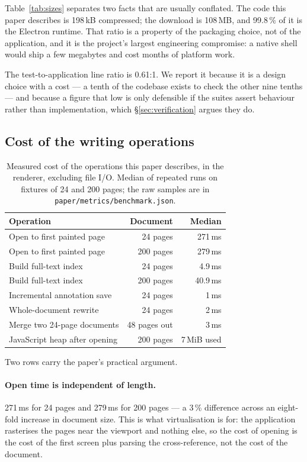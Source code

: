 Table~\ref{tab:sizes} separates two facts that are usually conflated. The code this paper
describes is 198\,kB compressed; the download is 108\,MB, and 99.8\,\% of it is the Electron
runtime. That ratio is a property of the packaging choice, not of the application, and it is
the project's largest engineering compromise: a native shell would ship a few megabytes and
cost months of platform work.

The test-to-application line ratio is 0.61:1. We report it because it is a design choice with
a cost --- a tenth of the codebase exists to check the other nine tenths --- and because a
figure that low is only defensible if the suites assert behaviour rather than implementation,
which \S\ref{sec:verification} argues they do.

\subsection{Cost of the writing operations}

\begin{table}[t]
  \centering
  \caption{Measured cost of the operations this paper describes, in the renderer, excluding
  file I/O. Median of repeated runs on fixtures of 24 and 200 pages; the raw samples are in
  \texttt{paper/\allowbreak metrics/\allowbreak benchmark.json}.}
  \label{tab:timings}
  \small
  \begin{tabular}{@{}lrr@{}}
    \toprule
    Operation & Document & Median \\
    \midrule
    Open to first painted page & 24 pages & 271\,ms \\
    Open to first painted page & 200 pages & 279\,ms \\
    Build full-text index & 24 pages & 4.9\,ms \\
    Build full-text index & 200 pages & 40.9\,ms \\
    Incremental annotation save & 24 pages & 1\,ms \\
    Whole-document rewrite & 24 pages & 2\,ms \\
    Merge two 24-page documents & 48 pages out & 3\,ms \\
    JavaScript heap after opening & 200 pages & 7\,MiB used \\
    \bottomrule
  \end{tabular}
\end{table}

Two rows carry the paper's practical argument.

\paragraph{Open time is independent of length.} 271\,ms for 24 pages and 279\,ms for 200 pages
--- a 3\,\% difference across an eight-fold increase in document size. This is what
virtualisation is for: the application rasterises the pages near the viewport and nothing else,
so the cost of opening is the cost of the first screen plus parsing the cross-reference, not
the cost of the document.

